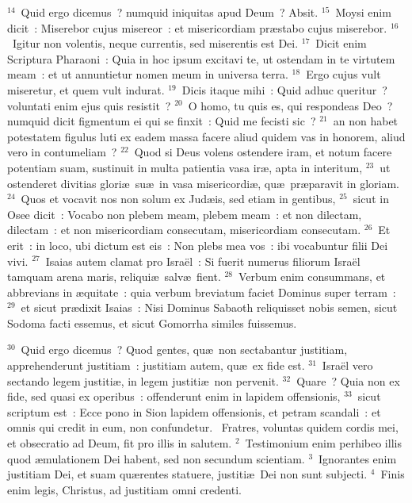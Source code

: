 ${}^{14}$~Quid ergo dicemus~? numquid iniquitas apud Deum~? Absit.
${}^{15}$~Moysi enim dicit~: Miserebor cujus misereor~: et misericordiam pr\ae stabo cujus miserebor.
${}^{16}$~Igitur non volentis, neque currentis, sed miserentis est Dei.
${}^{17}$~Dicit enim Scriptura Pharaoni~: Quia in hoc ipsum excitavi te, ut ostendam in te virtutem meam~: et ut annuntietur nomen meum in universa terra.
${}^{18}$~Ergo cujus vult miseretur, et quem vult indurat.
${}^{19}$~Dicis itaque mihi~: Quid adhuc queritur~? voluntati enim ejus quis resistit~?
${}^{20}$~O homo, tu quis es, qui respondeas Deo~? numquid dicit figmentum ei qui se finxit~: Quid me fecisti sic~?
${}^{21}$~an non habet potestatem figulus luti ex eadem massa facere aliud quidem vas in honorem, aliud vero in contumeliam~?
${}^{22}$~Quod si Deus volens ostendere iram, et notum facere potentiam suam, sustinuit in multa patientia vasa ir\ae , apta in interitum,
${}^{23}$~ut ostenderet divitias glori\ae\ su\ae\ in vasa misericordi\ae , qu\ae\ pr\ae paravit in gloriam.
${}^{24}$~Quos et vocavit nos non solum ex Jud\ae is, sed etiam in gentibus,
${}^{25}$~sicut in Osee dicit~: Vocabo non plebem meam, plebem meam~: et non dilectam, dilectam~: et non misericordiam consecutam, misericordiam consecutam.
${}^{26}$~Et erit~: in loco, ubi dictum est eis~: Non plebs mea vos~: ibi vocabuntur filii Dei vivi.
${}^{27}$~Isaias autem clamat pro Isra\"el~: Si fuerit numerus filiorum Isra\"el tamquam arena maris, reliqui\ae\ salv\ae\ fient.
${}^{28}$~Verbum enim consummans, et abbrevians in \ae quitate~: quia verbum breviatum faciet Dominus super terram~:
${}^{29}$~et sicut pr\ae dixit Isaias~: Nisi Dominus Sabaoth reliquisset nobis semen, sicut Sodoma facti essemus, et sicut Gomorrha similes fuissemus.


${}^{30}$~Quid ergo dicemus~? Quod gentes, qu\ae\ non sectabantur justitiam, apprehenderunt justitiam~: justitiam autem, qu\ae\ ex fide est.
${}^{31}$~Isra\"el vero sectando legem justiti\ae , in legem justiti\ae\ non pervenit.
${}^{32}$~Quare~? Quia non ex fide, sed quasi ex operibus~: offenderunt enim in lapidem offensionis,
${}^{33}$~sicut scriptum est~: Ecce pono in Sion lapidem offensionis, et petram scandali~: et omnis qui credit in eum, non confundetur.
~Fratres, voluntas quidem cordis mei, et obsecratio ad Deum, fit pro illis in salutem.
${}^{2}$~Testimonium enim perhibeo illis quod \ae mulationem Dei habent, sed non secundum scientiam.
${}^{3}$~Ignorantes enim justitiam Dei, et suam qu\ae rentes statuere, justiti\ae\ Dei non sunt subjecti.
${}^{4}$~Finis enim legis, Christus, ad justitiam omni credenti.



